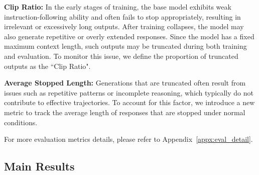 \textbf{Clip Ratio: }In the early stages of training, the base model exhibits weak instruction-following ability and often fails to stop appropriately, resulting in irrelevant or excessively long outputs. After training collapses, the model may also generate repetitive or overly extended responses. Since the model has a fixed maximum context length, such outputs may be truncated during both training and evaluation. To monitor this issue, we define the proportion of truncated outputs as the ``Clip Ratio".

\textbf{Average Stopped Length: }Generations that are truncated often result from issues such as repetitive patterns or incomplete reasoning, which typically do not contribute to effective trajectories. To account for this factor, we introduce a new metric to track the average length of responses that are stopped under normal conditions. 

For more evaluation metrics details, please refer to Appendix~\ref{appx:eval_detail}.



\subsection{Main Results}





